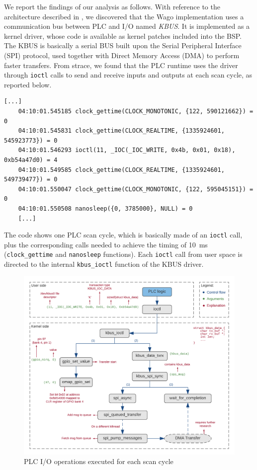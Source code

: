 We report the findings of our analysis as follows. With reference to the architecture described in , we discovered that the Wago implementation
uses a communication bus between PLC and I/O named \emph{KBUS}. It is implemented as a kernel driver, whose code is available as kernel patches included into the BSP.
The KBUS is basically a serial BUS built upon the Serial Peripheral Interface (SPI) protocol, used together with Direct Memory Access (DMA) to perform faster transfers.
From strace, we found that the PLC runtime uses the driver through \verb|ioctl| calls to send and receive inputs and outputs at each scan cycle, as reported below.
\begin{Verbatim}[fontsize=\small]
	[...]
	04:10:01.545185 clock_gettime(CLOCK_MONOTONIC, {122, 590121662}) = 0
	04:10:01.545831 clock_gettime(CLOCK_REALTIME, {1335924601, 545923773}) = 0
	04:10:01.546293 ioctl(11, _IOC(_IOC_WRITE, 0x4b, 0x01, 0x18), 0xb54a47d0) = 4
	04:10:01.549585 clock_gettime(CLOCK_REALTIME, {1335924601, 549739477}) = 0
	04:10:01.550047 clock_gettime(CLOCK_MONOTONIC, {122, 595045151}) = 0
	04:10:01.550508 nanosleep({0, 3785000}, NULL) = 0
	[...]
\end{Verbatim}
The code shows one PLC scan cycle, which is basically made of an \verb|ioctl| call, plus the corresponding calls needed to achieve the timing
of \SI{10}{ms} (\verb|clock_gettime| and \verb|nanosleep| functions).
Each \verb|ioctl| call from user space is directed to the internal \verb|kbus_ioctl| function of the KBUS driver.
\begin{figure}[h]
\centerline{\includegraphics[width=\textwidth]{res/plc-io}}
\caption{PLC I/O operations executed for each scan cycle \label{fig:plc-io}}
\end{figure}
